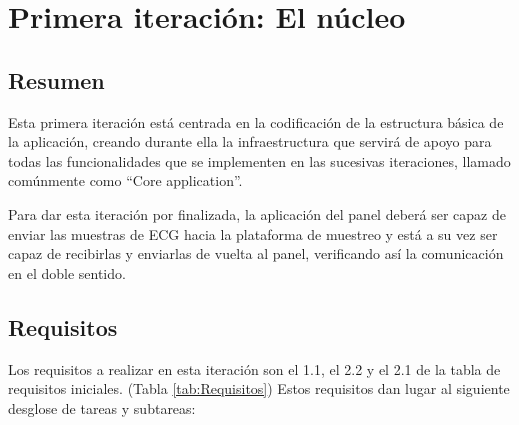 
\section{Primera iteración: El núcleo}
    \subsection{Resumen}

        Esta primera iteración está centrada en la codificación de la estructura básica de la aplicación, creando durante ella la infraestructura que servirá de apoyo para todas las funcionalidades que se implementen en las sucesivas iteraciones, llamado comúnmente como ``Core application''. 

        Para dar esta iteración por finalizada, la aplicación del panel deberá ser capaz de enviar las muestras de ECG hacia la plataforma de muestreo y está a su vez ser capaz de recibirlas y enviarlas de vuelta al panel, verificando así la comunicación en el doble sentido.

    \subsection{Requisitos}

        Los requisitos a realizar en esta iteración son el 1.1, el 2.2 y el 2.1 de la tabla de requisitos iniciales. (Tabla \ref{tab:Requisitos}) Estos requisitos dan lugar al siguiente desglose de tareas y subtareas:

